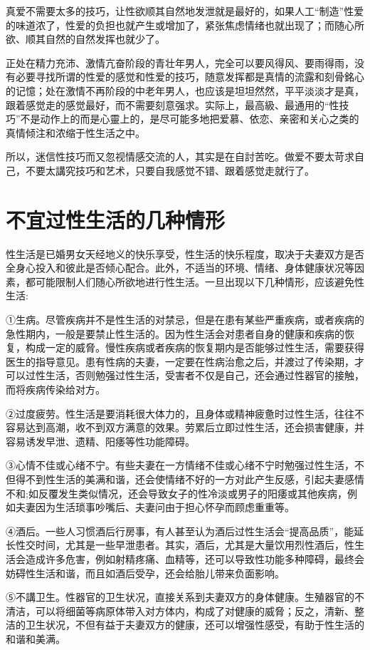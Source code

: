 \documentclass[12pt,UTF8]{ctexbook}
\begin{document}
真爱不需要太多的技巧，让性欲顺其自然地发泄就是最好的，如果人工“制造”性爱的味道浓了，性爱的负担也就产生或增加了，紧张焦虑情绪也就出现了；而随心所欲、顺其自然的自然发挥也就少了。

正处在精力充沛、激情亢奋阶段的青壮年男人，完全可以要风得风、要雨得雨，没有必要寻找所谓的性爱的感觉和性爱的技巧，随意发挥都是真情的流露和刻骨銘心的记憶；处在激情不再阶段的中老年男人，也应该是坦坦然然，平平淡淡才是真，跟着感觉走的感觉最好，而不需要刻意强求。实际上，最高級、最通用的“性技巧”不是动作上的而是心靈上的，是尽可能多地把爱慕、依恋、亲密和关心之类的真情倾注和浓缩于性生活之中。

所以，迷信性技巧而又忽视情感交流的人，其实是在自討苦吃。做爱不要太苛求自己，不要太講究技巧和艺术，只要自我感觉不错、跟着感觉走就行了。

\section{不宜过性生活的几种情形}


性生活是已婚男女天经地义的快乐享受，性生活的快乐程度，取决于夫妻双方是否全身心投入和彼此是否倾心配合。此外，不适当的环境、情绪、身体健康状况等因素，都可能限制人们随心所欲地进行性生活。一旦出现以下几种情形，应该避免性生活:

①生病。尽管疾病并不是性生活的对禁忌，但是在患有某些严重疾病，或者疾病的急性期内，一般是要禁止性生活的。因为性生活会对患者自身的健康和疾病的恢复，构成一定的威脅。慢性疾病或者疾病的恢复期内是否能够过性生活，需要获得医生的指导意见。患有性病的夫妻，一定要在性病治愈之后，并渡过了传染期，才可以过性生活，否则勉强过性生活，受害者不仅是自己，还会通过性器官的接触，而将疾病传染给对方。

②过度疲劳。性生活是要消耗很大体力的，且身体或精神疲惫时过性生活，往往不容易达到高潮，收不到双方满意的效果。劳累后立即过性生活，还会损害健康，并容易诱发早泄、遗精、阳痿等性功能障碍。

③心情不佳或心绪不宁。有些夫妻在一方情绪不佳或心绪不宁时勉强过性生活，不但得不到性生活的美满和谐，还会使情绪不好的一方对此产生反感，引起夫妻感情不和;如反覆发生类似情况，还会导致女子的性冷淡或男子的阳痿或其他疾病，例如夫妻因为生活琐事吵嘴后、夫妻问由于担心怀孕而顾虑重重等。

④酒后。一些人习惯酒后行房事，有人甚至认为酒后过性生活会“提高品质”，能延长性交时间，尤其是一些早泄患者。其实，酒后，尤其是大量饮用烈性酒后，性生活会造成许多危害，例如射精疼痛、血精等，还可以导致性功能多种障碍，最终会妨碍性生活和谐，而且如酒后受孕，还会给胎儿带来负面影响。

⑤不講卫生。性器官的卫生状况，直接关系到夫妻双方的身体健康。生殖器官的不清洁，可以将细菌等病原体带入对方体内，构成了对健康的威脅；反之，清新、整洁的卫生状况，不但有益于夫妻双方的健康，还可以增强性感受，有助于性生活的和谐和美满。
\end{document}
